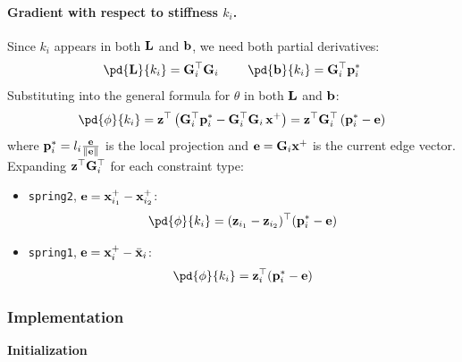 \paragraph{Gradient with respect to stiffness $k_i$.}
Since $k_i$ appears in both $\mathbf{L}$ and $\mathbf{b}$, we need both partial derivatives:
\begin{equation}
    \pd{\LL}{k_i} = \G_i^\top\G_i
    \qquad \
    \pd{\bb}{k_i} = \G_i^\top\p_i^*
\end{equation}
Substituting into the general formula for $\theta$ in both $\mathbf{L}$ and $\mathbf{b}$:
\begin{equation}
    \pd{\phi}{k_i} 
    = \z^\top\left(\G_i^\top\p_i^* - \G_i^\top\G_i\,\x^+\right)
    = \z^\top\G_i^\top\left(\p_i^* - \e\right)
\end{equation}
where $\mathbf{p}_i^* = l_i\frac{\mathbf{e}}{\|\mathbf{e}\|}$ is the local projection and $\mathbf{e} = \mathbf{G}_i\mathbf{x}^+$  is the current edge vector. Expanding $\mathbf{z}^\top\mathbf{G}_i^\top$ for each constraint type:
\begin{itemize}
    \item \texttt{spring2}, $\mathbf{e} = \mathbf{x}^+_{i_1} - \mathbf{x}^+_{i_2}$:
    \begin{equation}
        \pd{\phi}{k_i} = (\z_{i_1} - \z_{i_2})^\top(\p_i^* - \e)
    \end{equation}
    \item \texttt{spring1}, $\mathbf{e} = \mathbf{x}^+_i - \bar{\mathbf{x}}_i$:
    \begin{equation}
        \pd{\phi}{k_i} = \z_i^\top(\p_i^* - \e)
    \end{equation}
\end{itemize}



\subsubsection{Implementation}

\newcommand{\algsection}[1]{%
    \hspace{2.0em}\noindent\textbf{#1}\hspace{0.8em}\hrulefill
}

\algsection{Initialization}

